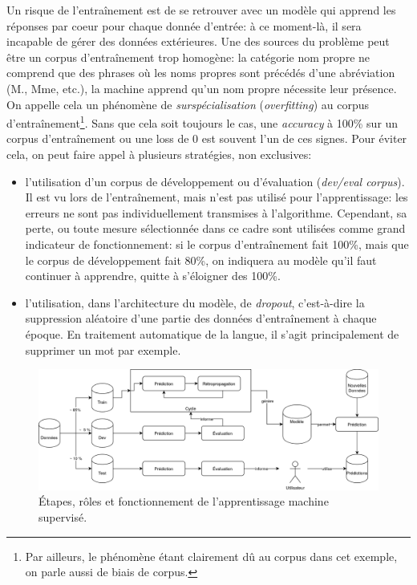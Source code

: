 \label{deep-learning:overfitting}
Un risque de l'entraînement est de se retrouver avec un modèle qui apprend les réponses par coeur pour chaque donnée d'entrée: à ce moment-là, il sera incapable de gérer des données extérieures. Une des sources du problème peut être un corpus d'entraînement trop homogène: la catégorie nom propre ne comprend que des phrases où les noms propres sont précédés d'une abréviation (M., Mme, etc.), la machine apprend qu'un nom propre nécessite leur présence. On appelle cela un phénomène de \textit{surspécialisation} (\textit{overfitting}) au corpus d'entraînement\footnote{Par ailleurs, le phénomène étant clairement dû au corpus dans cet exemple, on parle aussi de biais de corpus.}. Sans que cela soit toujours le cas, une \textit{accuracy} à 100\% sur un corpus d'entraînement ou une loss de 0 est souvent l'un de ces signes. Pour éviter cela, on peut faire appel à plusieurs stratégies, non exclusives:
\begin{itemize}
    \item l'utilisation d'un corpus de développement ou d'évaluation (\textit{dev/eval corpus}). Il est vu lors de l'entraînement, mais n'est pas utilisé pour l'apprentissage: les erreurs ne sont pas individuellement transmises à l'algorithme. Cependant, sa perte, ou toute mesure sélectionnée dans ce cadre sont utilisées comme grand indicateur de fonctionnement: si le corpus d'entraînement fait 100\%, mais que le corpus de développement fait 80\%, on indiquera au modèle qu'il faut continuer à apprendre, quitte à s'éloigner des 100\%.
    \item l'utilisation, dans l'architecture du modèle, de \textit{dropout}, c'est-à-dire la suppression aléatoire d'une partie des données d'entraînement à chaque époque. En traitement automatique de la langue, il s'agit principalement de supprimer un mot par exemple.
\end{itemize}


\begin{figure}[h]
    \centering
    \includegraphics[width=\linewidth]{results/deep-learning/explanations/MachineLearning.png}
    \caption{Étapes, rôles et fonctionnement de l'apprentissage machine supervisé.}
    \label{fig:deep-learning:fonctionnement}
\end{figure}

